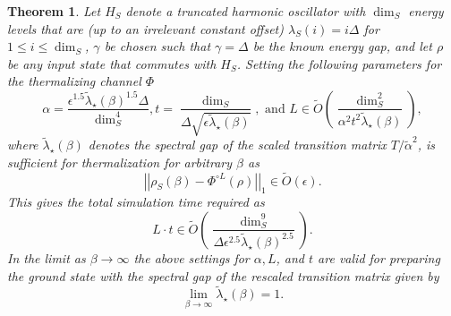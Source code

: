 \documentclass[
 amsmath,amssymb,
 aps,
onecolumn, 
nofootinbib]{revtex4-2}
\newtheorem{theorem}{Theorem}
\newcommand{\norm}[1]{\left|\left| #1 \right|\right|}
\newcommand{\bigotilde}[1]{\widetilde{O} \left( #1 \right)}
\begin{document}
\begin{theorem}\label{thm:harmonic_oscillator}
    Let $H_S$ denote a truncated harmonic oscillator with $\dim_S$ energy levels that are (up to an irrelevant constant offset) $\lambda_S(i) = i \Delta$ for $1 \le i \le \dim_S$, $\gamma$ be chosen such that $\gamma = \Delta$ be the known energy gap, and let $\rho$ be any input state that commutes with $H_S$. Setting the following parameters for the thermalizing channel $\Phi$
    \begin{equation}
        \alpha = \frac{\epsilon^{1.5} \widetilde{\lambda}_\star(\beta)^{1.5} \Delta}{\dim_S^4}, t = \frac{\dim_S}{\Delta \sqrt{\epsilon \widetilde{\lambda}_\star(\beta)}}, \text{ and } L \in \bigotilde{\frac{\dim_S^2}{\alpha^2 t^2 \widetilde{\lambda}_\star(\beta)}},
    \end{equation}
    where $\widetilde{\lambda}_\star(\beta)$ denotes the spectral gap of the scaled transition matrix $T / \widetilde{\alpha}^2$, is sufficient for thermalization for arbitrary $\beta$ as
    \begin{equation}
        \norm{\rho_S(\beta) - \Phi^{\circ L}(\rho)}_1 \in \bigotilde{\epsilon}.
    \end{equation}
    This gives the total simulation time required as
    \begin{equation}
        L \cdot t \in \bigotilde{\frac{\dim_S^9}{\Delta \epsilon^{2.5} \widetilde{\lambda}_\star(\beta)^{2.5}}}.
    \end{equation}
    In the limit as $\beta \to \infty$ the above settings for $\alpha, L$, and $t$ are valid for preparing the ground state with the spectral gap of the rescaled transition matrix given by
    \begin{equation}
        \lim_{\beta \to \infty} \widetilde{\lambda}_\star(\beta) = 1.
    \end{equation}

    
\end{theorem}
\end{document}
